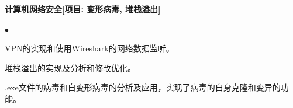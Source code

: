 \documentclass[UTF8]{ctexart}
\newcommand{\lineunder}{\vspace*{-8pt} \\
\hspace*{-18pt} \hrulefill \\}
\newcommand{\header}[1]{\large \vspace*{12pt}{\Large \hspace*{-15pt}\vspace*{6pt} \textsc{#1}} \vspace*{-6pt} \lineunder}
\newcommand{\courses}[1]{\vspace*{12pt}\normalsize \textbf{#1}\\
}    %
\newenvironment{courseworks}{
\begin{list}
        {$\bullet$}{\topsep 0pt
        \itemsep -2pt}}{\vspace*{4pt}
\end{list}
}
\begin{document}

\courses{计算机网络安全[项目: 变形病毒, 堆栈溢出]}
\begin{courseworks}
    \item	VPN的实现和使用Wireshark的网络数据监听。
    \item	堆栈溢出的实现及分析和修改优化。
    \item	.exe文件的病毒和自变形病毒的分析及应用，实现了病毒的自身克隆和变异的功能。
\end{courseworks}

\end{document}

